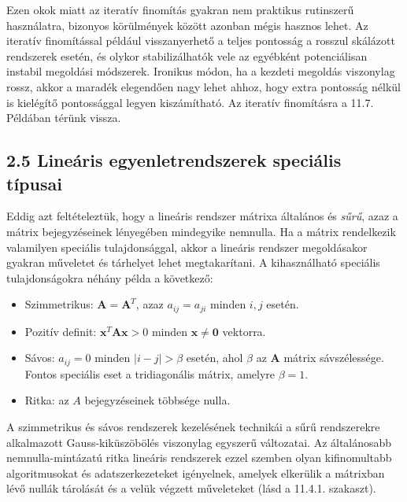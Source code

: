 \documentclass[
  magyar,
  11pt]{article}
\providecommand{\tightlist}{%
  \setlength{\itemsep}{0pt}\setlength{\parskip}{0pt}}
\providecommand{\boldsymbol}[1]{\mathbf{#1}}
\begin{document}
Ezen okok miatt az iteratív finomítás gyakran nem praktikus rutinszerű
használatra, bizonyos körülmények között azonban mégis hasznos lehet. Az
iteratív finomítással például visszanyerhető a teljes pontosság a
rosszul skálázott rendszerek esetén, és olykor stabilizálhatók vele az
egyébként potenciálisan instabil megoldási módszerek. Ironikus módon, ha
a kezdeti megoldás viszonylag rossz, akkor a maradék elegendően nagy
lehet ahhoz, hogy extra pontosság nélkül is kielégítő pontossággal
legyen kiszámítható. Az iteratív finomításra a 11.7. Példában térünk
vissza.

\subsection{2.5 Lineáris egyenletrendszerek speciális
típusai}\label{lineuxe1ris-egyenletrendszerek-speciuxe1lis-tuxedpusai}

Eddig azt feltételeztük, hogy a lineáris rendszer mátrixa általános és
\emph{sűrű}, azaz a mátrix bejegyzéseinek lényegében mindegyike
nemnulla. Ha a mátrix rendelkezik valamilyen speciális tulajdonsággal,
akkor a lineáris rendszer megoldásakor gyakran műveletet és tárhelyet
lehet megtakarítani. A kihasználható speciális tulajdonságokra néhány
példa a következő:

\begin{itemize}
\tightlist
\item
  Szimmetrikus: \(\mathbf{A} = \mathbf{A}^T\), azaz \(a_{ij} = a_{ji}\)
  minden \(i, j\) esetén.
\item
  Pozitív definit: \(\mathbf{x}^T \mathbf{A} \mathbf{x} > 0\) minden
  \(\mathbf{x} \neq \mathbf{0}\) vektorra.
\item
  Sávos: \(a_{ij} = 0\) minden \(|i - j| > \beta\) esetén, ahol
  \(\beta\) az \(\boldsymbol{A}\) mátrix sávszélessége. Fontos speciális
  eset a tridiagonális mátrix, amelyre \(\beta = 1\).
\item
  Ritka: az \(A\) bejegyzéseinek többsége nulla.
\end{itemize}

A szimmetrikus és sávos rendszerek kezelésének technikái a sűrű
rendszerekre alkalmazott Gauss-kiküszöbölés viszonylag egyszerű
változatai. Az általánosabb nemnulla-mintázatú ritka lineáris rendszerek
ezzel szemben olyan kifinomultabb algoritmusokat és adatszerkezeteket
igényelnek, amelyek elkerülik a mátrixban lévő nullák tárolását és a
velük végzett műveleteket (lásd a 11.4.1. szakaszt).
\end{document}
